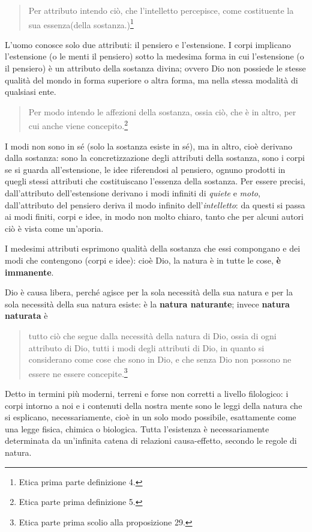 \begin{quotation}
	\small Per attributo intendo ciò, che l'intelletto percepisce, come costituente la sua essenza(della sostanza.)\footnote{Etica prima parte definizione 4.}
\end{quotation}

L'uomo conosce solo due attributi: il pensiero e l'estensione. I corpi implicano l'estensione (o le menti il pensiero) sotto la medesima forma in cui l'estensione (o il pensiero) è un attributo della sostanza divina; ovvero Dio non possiede le stesse qualità del mondo in forma superiore o altra forma, ma nella stessa modalità di qualsiasi ente.

\begin{quotation}
	\small Per modo intendo le affezioni della sostanza, ossia ciò, che è in altro, per cui anche viene concepito.\footnote{Etica parte prima definizione 5.}
\end{quotation}

I modi non sono in sé (solo la sostanza esiste in sé), ma in altro, cioè derivano dalla sostanza: sono la concretizzazione degli attributi della sostanza, sono i corpi se si guarda all'estensione, le idee riferendosi al pensiero, ognuno prodotti in quegli stessi attributi che costituiscano l'essenza della sostanza. Per essere precisi, dall'attributo dell'estensione derivano i modi infiniti di \textit{quiete} e \textit{moto}, dall'attributo del pensiero deriva il modo infinito dell'\textit{intelletto}: da questi si passa ai modi finiti, corpi e idee, in modo non molto chiaro, tanto che per alcuni autori ciò è vista come un'aporia.

I medesimi attributi esprimono qualità della sostanza che essi compongano e dei modi che contengono (corpi e idee): cioè Dio, la natura è in tutte le cose, \textbf{è immanente}.

Dio è causa libera, perché agisce per la sola necessità della sua natura e per la sola necessità della sua natura esiste: è la \textbf{natura naturante}; invece \textbf{natura naturata} è 
\begin{quotation}
	\small tutto ciò che segue dalla necessità della natura di Dio, ossia di ogni attributo di Dio, tutti i modi degli attributi di Dio, in quanto si considerano come cose che sono in Dio, e che senza Dio non possono ne essere ne essere concepite.\footnote{Etica parte prima scolio alla proposizione 29.}
\end{quotation}

Detto in termini più moderni, terreni e forse non corretti a livello filologico: i corpi intorno a noi e i contenuti della nostra mente sono le leggi della natura che si esplicano, necessariamente, cioè in un solo modo possibile, esattamente come una legge fisica, chimica o biologica. Tutta l'esistenza è necessariamente determinata da un'infinita catena di relazioni causa-effetto, secondo le regole di natura. 

